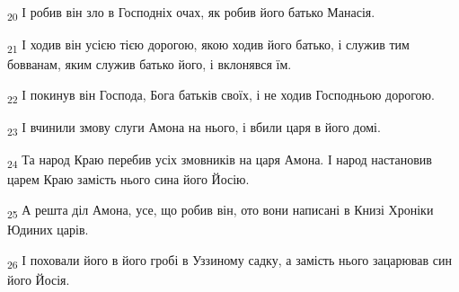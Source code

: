 \begin{tcolorbox}
\textsubscript{20} І робив він зло в Господніх очах, як робив його батько Манасія.
\end{tcolorbox}
\begin{tcolorbox}
\textsubscript{21} І ходив він усією тією дорогою, якою ходив його батько, і служив тим бовванам, яким служив батько його, і вклонявся їм.
\end{tcolorbox}
\begin{tcolorbox}
\textsubscript{22} І покинув він Господа, Бога батьків своїх, і не ходив Господньою дорогою.
\end{tcolorbox}
\begin{tcolorbox}
\textsubscript{23} І вчинили змову слуги Амона на нього, і вбили царя в його домі.
\end{tcolorbox}
\begin{tcolorbox}
\textsubscript{24} Та народ Краю перебив усіх змовників на царя Амона. І народ настановив царем Краю замість нього сина його Йосію.
\end{tcolorbox}
\begin{tcolorbox}
\textsubscript{25} А решта діл Амона, усе, що робив він, ото вони написані в Книзі Хроніки Юдиних царів.
\end{tcolorbox}
\begin{tcolorbox}
\textsubscript{26} І поховали його в його гробі в Уззиному садку, а замість нього зацарював син його Йосія.
\end{tcolorbox}
